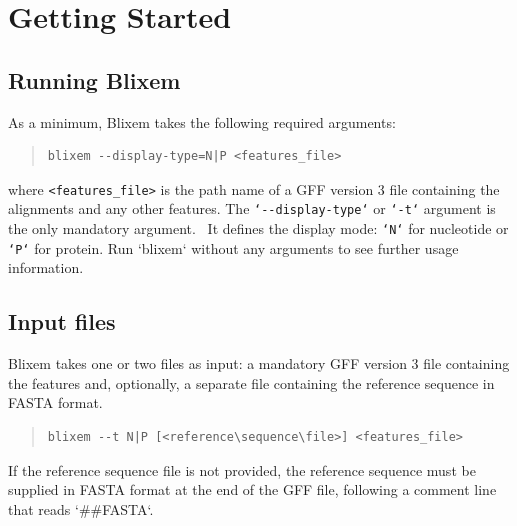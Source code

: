 \documentclass[letterpaper]{article}
\begin{document}
\clearpage
{\color[rgb]{0.0,0.27058825,0.5254902}\section[Getting Started]{Getting Started}}
\hypertarget{RefHeading1461056909880}{}
{\color[rgb]{0.30980393,0.5058824,0.7411765}\subsection[Running Blixem]{Running Blixem}}
\hypertarget{RefHeading1481056909880}{}{
As a minimum, Blixem takes the following required arguments:}
\begin{quote}
\begin{verbatim}
blixem --display-type=N|P <features_file>
\end{verbatim}
\end{quote}
{where \texttt{{\textless}features\_file{\textgreater}} is the path name of a GFF
version 3 file containing the alignments and any other features. The
 \texttt{{\textquoteleft}{}-{}-display-type{\textquoteleft}} or
\texttt{{\textquoteleft}{}-t{\textquoteleft}} argument is the only mandatory
argument. \ It defines the display mode:
\texttt{{\textquoteleft}N{\textquoteleft}} for nucleotide or
\texttt{{\textquoteleft}P{\textquoteleft}} for protein. 
Run {\textquoteleft}blixem{\textquoteleft} without any arguments to see
further usage information.}

{\color[rgb]{0.30980393,0.5058824,0.7411765}\subsection[Input files]{Input files}}
\hypertarget{RefHeading1501056909880}{}{
Blixem takes one or two files as input: a mandatory GFF version 3 file
containing the features and, optionally, a separate file containing the
reference sequence in FASTA format.}

\bigskip

\begin{quote}
\begin{verbatim}
blixem --t N|P [<reference\sequence\file>] <features_file>
\end{verbatim}
\end{quote}

{If the reference sequence file is not provided, the reference sequence
must be supplied in FASTA format at the end of the GFF file, following
a comment line that reads {\textquoteleft}\#\#FASTA{\textquoteleft}.}
\end{document}
